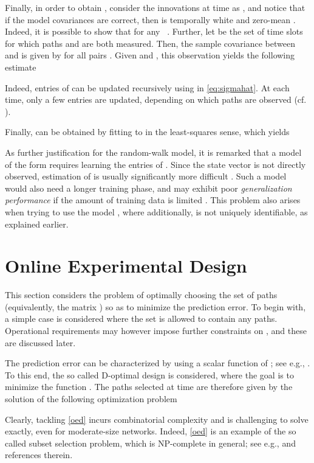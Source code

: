 \documentclass[draftcls,onecolumn,12pt]{IEEEtran}
\theoremstyle{plain}\newtheorem{thm}{Theorem}
\theoremstyle{definition}
\theoremstyle{remark}
\begin{document}
Finally, in order to obtain , consider the innovations at time  as , and notice that if the model covariances are correct, then  is temporally white and zero-mean \cite{Mehra70}.
Indeed, it is possible to show that  for any ~\cite{Myers76}.
Further, let  be the set of time slots for which paths  and  are both measured. 
Then, the sample covariance between  and  is given by  for all pairs .
Given  and , this observation yields the following estimate

Indeed, entries of  can be updated recursively using  in \eqref{eq:sigmahat}. 
At each time, only a few entries are updated, depending on which paths are observed (cf. ). 

Finally,  can be obtained by fitting  to  in the least-squares sense, which yields


{ As further justification for the random-walk model, it is remarked that a model of the form  requires learning the entries of . Since the state vector is not directly observed, estimation of  is usually significantly more difficult \cite{AnM79, gg96, gg96-2}. Such a model would also need a longer training phase, and may exhibit poor \emph{generalization performance} if the amount of training data is limited \cite{bishop}. This problem also arises when trying to use the model , where additionally,  is not uniquely identifiable, as explained earlier.}

\section{Online Experimental Design} \label{expdesign}
This section considers the problem of optimally choosing the set of paths  (equivalently, the matrix ) so as to minimize the prediction error. 
To begin with, a simple case is considered where the set  is allowed to contain any  paths. 
Operational requirements may however impose further constraints on , and these are discussed later. 

The prediction error can be characterized by using a scalar function of ; see e.g., \cite{bach}.
To this end, the so called D-optimal design is considered, where the goal is to minimize the function .
The paths selected at time  are therefore given by the solution of the following optimization problem

Clearly, tackling \eqref{oed} incurs combinatorial complexity and is challenging to solve exactly, even for moderate-size networks.
Indeed, \eqref{oed} is an example of the so called subset selection problem, which is NP-complete in general; see e.g., \cite{kempe} and references therein.
\end{document}
